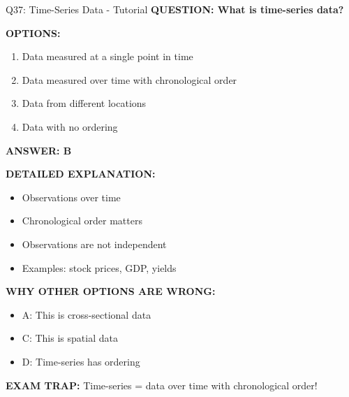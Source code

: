 \documentclass[8pt]{beamer}
\begin{document}
	\begin{frame}{Q37: Time-Series Data - Tutorial}
		\fontsize{6.5}{7.5}\selectfont
		\textbf{QUESTION: What is time-series data?}
		
		\vspace{0.1cm}
		\textbf{OPTIONS:}
		\begin{enumerate}
			\item Data measured at a single point in time
			\item Data measured over time with chronological order
			\item Data from different locations
			\item Data with no ordering
		\end{enumerate}
		
		\vspace{0.1cm}
		\textcolor{myblue}{\textbf{ANSWER: B}}
		
		\vspace{0.1cm}
		\textbf{DETAILED EXPLANATION:}
		\begin{itemize}
			\item Observations over time
			\item Chronological order matters
			\item Observations are not independent
			\item Examples: stock prices, GDP, yields
		\end{itemize}
		
		\vspace{0.1cm}
		\textcolor{myred}{\textbf{WHY OTHER OPTIONS ARE WRONG:}}
		\begin{itemize}
			\item \textcolor{myred}{A:} This is cross-sectional data
			\item \textcolor{myred}{C:} This is spatial data
			\item \textcolor{myred}{D:} Time-series has ordering
		\end{itemize}
		
		\textcolor{myred}{\textbf{EXAM TRAP:}} Time-series = \textcolor{myblue}{data over time with chronological order}!
	\end{frame}
	
\end{document}
